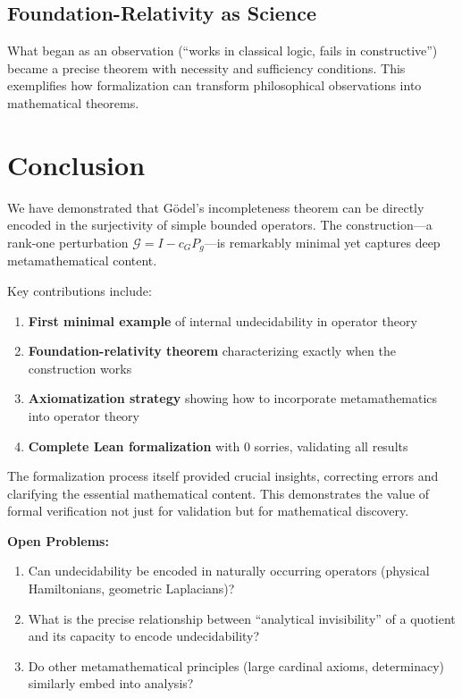 \documentclass[11pt]{article}
\theoremstyle{definition}
\begin{document}
\subsection{Foundation-Relativity as Science}

What began as an observation (``works in classical logic, fails in constructive'') became a precise theorem with necessity and sufficiency conditions. This exemplifies how formalization can transform philosophical observations into mathematical theorems.

\section{Conclusion}

We have demonstrated that Gödel's incompleteness theorem can be directly encoded in the surjectivity of simple bounded operators. The construction---a rank-one perturbation $\mathcal{G} = I - c_G P_g$---is remarkably minimal yet captures deep metamathematical content.

Key contributions include:

\begin{enumerate}
\item \textbf{First minimal example} of internal undecidability in operator theory
\item \textbf{Foundation-relativity theorem} characterizing exactly when the construction works
\item \textbf{Axiomatization strategy} showing how to incorporate metamathematics into operator theory
\item \textbf{Complete Lean formalization} with 0 sorries, validating all results
\end{enumerate}

The formalization process itself provided crucial insights, correcting errors and clarifying the essential mathematical content. This demonstrates the value of formal verification not just for validation but for mathematical discovery.

\begin{mdframed}[roundcorner=4pt]
\textbf{Open Problems:}
\begin{enumerate}
\item Can undecidability be encoded in naturally occurring operators (physical Hamiltonians, geometric Laplacians)?
\item What is the precise relationship between ``analytical invisibility'' of a quotient and its capacity to encode undecidability?
\item Do other metamathematical principles (large cardinal axioms, determinacy) similarly embed into analysis?
\end{enumerate}
\end{mdframed}
\end{document}
